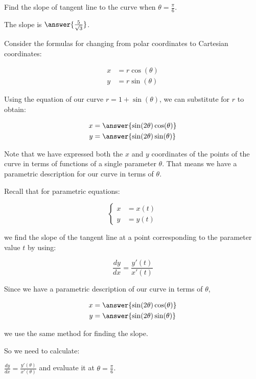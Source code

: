 \documentclass{ximera}
\begin{document}
\begin{exercise}
\begin{hint}
\end{hint}

\begin{exercise}

Find the slope of tangent line to the curve when $\theta=\frac{\pi}{6}$. 

The slope is $\answer{ \frac{5}{\sqrt{3}} }$.

\begin{hint}

Consider the formulas for changing from polar coordinates to Cartesian coordinates:

\begin{align*}
x&=r\cos(\theta) \\
y&=r\sin(\theta)
\end{align*}

Using the equation of our curve $r=1+\sin(\theta)$, we can substitute for $r$ to obtain:

\begin{align*}
x&=\answer{\sin(2\theta)\cos(\theta)} \\
y&=\answer{\sin(2\theta)\sin(\theta) }
\end{align*}

Note that we have expressed both the $x$ and $y$ coordinates of the points of the curve in terms of functions of a single parameter $\theta$. That means we have a parametric description for our curve in terms of $\theta$. 

Recall that for parametric equations: 

\[
\begin{cases}
x&=x(t) \\
y&=y(t)
\end{cases}
\]

we find the slope of the tangent line at a point corresponding to the parameter value $t$ by using: 

\[
\frac{dy}{dx}=\frac{ y'(t)}{x'(t)}
\]

Since we have a parametric description of our curve in terms of $\theta$, 

\begin{align*}
x&=\answer{\sin(2\theta)\cos(\theta)} \\
y&=\answer{\sin(2\theta)\sin(\theta) }
\end{align*}

we use the same method for finding the slope. 

So we need to calculate:

$\frac{dy}{dx}=\frac{ y'(\theta)}{x'(\theta)}$ and evaluate it at $\theta=\frac{\pi}{6}$. 


\end{hint}
\end{exercise}
\end{exercise}
\end{document}
